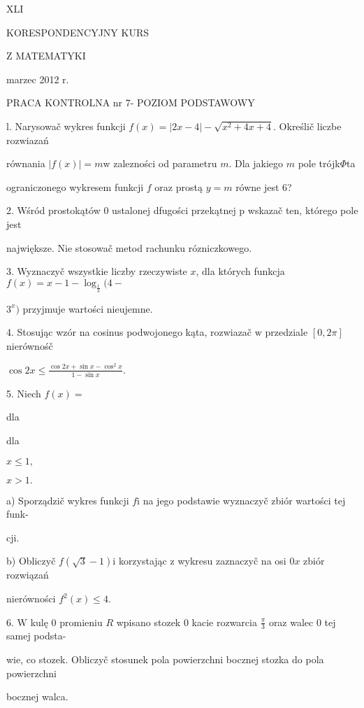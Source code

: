 \documentclass[a4paper,12pt]{article}
\begin{document}
XLI

KORESPONDENCYJNY KURS

Z MATEMATYKI

marzec 2012 r.

PRACA KONTROLNA nr 7- POZIOM PODSTAWOWY

l. Narysowač wykres funkcji $f(x) = |2x-4|-\sqrt{x^{2}+4x+4}$. Określič liczbe rozwiazań

równania $|f(x)| = m \mathrm{w}$ zalezności od parametru $m$. Dla jakiego $m$ pole trójk$\Phi$ta

ograniczonego wykresem funkcji $f$ oraz prostą $y=m$ równe jest 6?

2. Wśród prostokątów 0 ustalonej dfugości przekątnej p wskazač ten, którego pole jest

największe. Nie stosowač metod rachunku rózniczkowego.

3. Wyznaczyč wszystkie liczby rzeczywiste $x$, dla których funkcja $f(x)=x-1-\log_{\frac{1}{3}}(4-$

$3^{x})$ przyjmuje wartości nieujemne.

4. Stosując wzór na cosinus podwojonego kąta, rozwiazač $\mathrm{w}$ przedziale $[0,2\pi]$ nierównośč

$\displaystyle \cos 2x\leq\frac{\cos 2x+\sin x-\cos^{2}x}{1-\sin x}.$

5. Niech $f(x)=$

dla

dla

$x\leq 1,$

$x>1.$

a) Sporządzič wykres funkcji $f\mathrm{i}$ na jego podstawie wyznaczyč zbiór wartości tej funk-

cji.

b) Obliczyč $f(\sqrt{3}-1) \mathrm{i}$ korzystając $\mathrm{z}$ wykresu zaznaczyč na osi $0x$ zbiór rozwiązań

nierówności $f^{2}(x)\leq 4.$

6. $\mathrm{W}$ kulę $0$ promieniu $R$ wpisano stozek $0$ kacie rozwarcia $\displaystyle \frac{\pi}{3}$ oraz walec $0$ tej samej podsta-

wie, co stozek. Obliczyč stosunek pola powierzchni bocznej stozka do pola powierzchni

bocznej walca.
\end{document}
